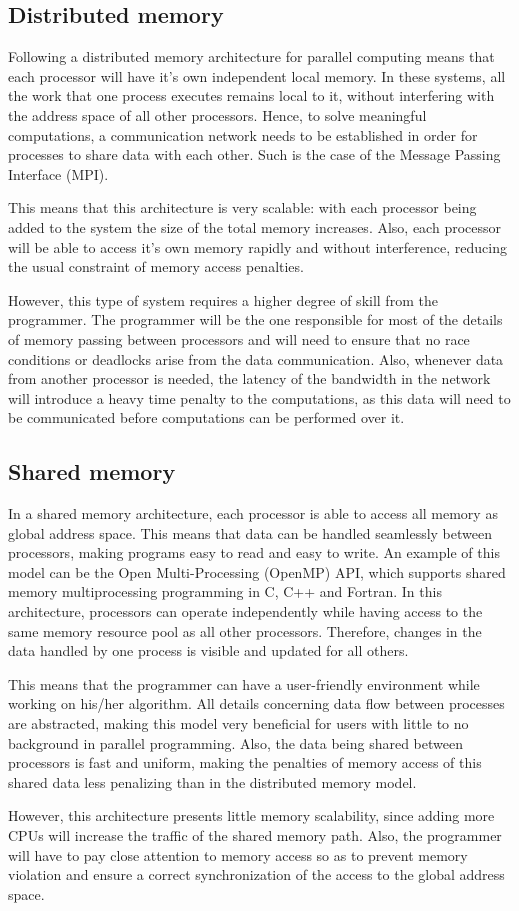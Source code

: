 \documentclass[12pt]{book}
\begin{document}
\subsection{Distributed memory}
Following a distributed memory architecture for parallel computing means that each processor will have it's own independent local memory. In these systems, all the work that one process executes remains local to it, without interfering with the address space of all other processors. Hence, to solve meaningful computations, a communication network needs to be established in order for processes to share data with each other. Such is the case of the Message Passing Interface (MPI).\par
This means that this architecture is very scalable: with each processor being added to the system the size of the total memory increases. Also, each processor will be able to access it's own memory rapidly and without interference, reducing the usual constraint of memory access penalties.
\par However, this type of system requires a higher degree of skill from the programmer. The programmer will be the one responsible for most of the details of memory passing between processors and will need to ensure that no race conditions or deadlocks arise from the data communication. Also, whenever data from another processor is needed, the latency of the bandwidth in the network will introduce a heavy time penalty to the computations, as this data will need to be communicated before computations can be performed over it.
\subsection{Shared memory}
In a shared memory architecture, each processor is able to access all memory as global address space. This means that data can be handled seamlessly between processors, making programs easy to read and easy to write. An example of this model can be the Open Multi-Processing (OpenMP) API, which supports shared memory multiprocessing programming in C, C++ and Fortran. In this architecture, processors can operate independently while having access to the same memory resource pool as all other processors. Therefore, changes in the data handled by one process is visible and updated for all others. \par
This means that the programmer can have a user-friendly environment while working on his/her algorithm. All details concerning data flow between processes are abstracted, making this model very beneficial for users with little to no background in parallel programming. Also, the data being shared between processors is fast and uniform, making the penalties of memory access of this shared data less penalizing than in the distributed memory model.
\par However, this architecture presents little memory scalability, since adding more CPUs will increase the traffic of the shared memory path. Also, the programmer will have to pay close attention to memory access so as to prevent memory violation and ensure a correct synchronization of the access to the global address space.
\end{document}
